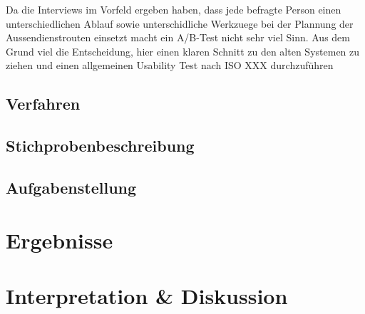 \documentclass[Bachelorarbeit.tex]{subfiles}
\begin{document}
Da die Interviews im Vorfeld ergeben haben, dass jede befragte Person einen unterschiedlichen Ablauf sowie unterschidliche Werkzuege bei der Plannung der Aussendienstrouten einsetzt macht ein A/B-Test nicht sehr viel Sinn.
Aus dem Grund viel die Entscheidung, hier einen klaren Schnitt zu den alten Systemen zu ziehen und einen allgemeinen Usability Test nach ISO XXX durchzuführen





\subsection{Verfahren}


\subsection{Stichprobenbeschreibung}


\subsection{Aufgabenstellung}


\section{Ergebnisse}
\label{Ergebnisse}

\section{Interpretation \& Diskussion}
\label{InterpretationDiskussion}
\end{document}
